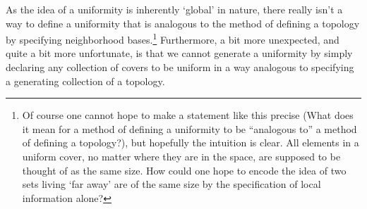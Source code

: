 As the idea of a uniformity is inherently `global' in nature, there really isn't a way to define a uniformity that is analogous to the method of defining a topology by specifying neighborhood bases.\footnote{Of course one cannot hope to make a statement like this precise (What does it mean for a method of defining a uniformity to be ``analogous to'' a method of defining a topology?), but hopefully the intuition is clear.  All elements in a uniform cover, no matter where they are in the space, are supposed to be thought of as the same size.  How could one hope to encode the idea of two sets living `far away' are of the same size by the specification of local information alone?}  Furthermore, a bit more unexpected, and quite a bit more unfortunate, is that we cannot generate a uniformity by simply declaring any collection of covers to be uniform in a way analogous to specifying a generating collection of a topology.
